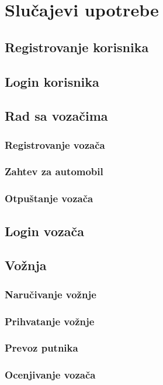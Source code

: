 \section{\bfseries Slu\v cajevi upotrebe}

\subsection{\bfseries Registrovanje korisnika}
\subsection{\bfseries Login korisnika}
\subsection{\bfseries Rad sa voza\v cima}
\subsubsection{\bfseries Registrovanje voza\v ca}
\subsubsection{\bfseries Zahtev za automobil}
\subsubsection{\bfseries Otpu\v stanje voza\v ca}
\subsection{\bfseries Login voza\v ca}
\subsection{\bfseries Vo\v znja}
\subsubsection{\bfseries Naru\v civanje vo\v znje}
\subsubsection{\bfseries Prihvatanje vo\v znje}
\subsubsection{\bfseries Prevoz putnika}
\subsubsection{\bfseries Ocenjivanje voza\v ca}
